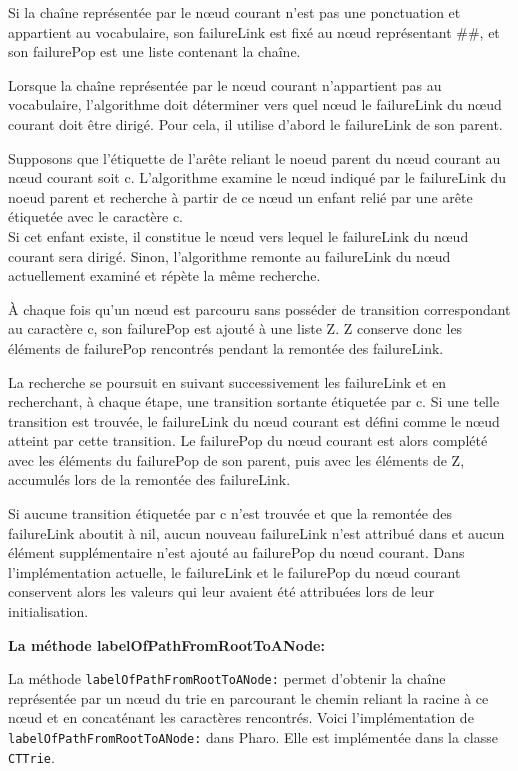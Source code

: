 \documentclass[12pt,a4paper]{report}
\begin{document}
	Si la chaîne représentée par le nœud courant n'est pas une ponctuation et appartient au vocabulaire, son failureLink est fixé au nœud représentant \#\#, et son failurePop est une liste contenant la chaîne.
	
	Lorsque la chaîne représentée par le nœud courant n'appartient pas au vocabulaire, l'algorithme doit déterminer vers quel nœud le failureLink du nœud courant doit être dirigé. Pour cela, il utilise d'abord le failureLink de son parent.
	
	Supposons que l'étiquette de l'arête reliant le noeud parent du nœud courant au nœud courant soit c. L'algorithme examine le nœud indiqué par le failureLink du noeud parent et recherche à partir de ce nœud un enfant relié par une arête étiquetée avec le caractère c.\\
	Si cet enfant existe, il constitue le nœud vers lequel le failureLink du nœud courant sera dirigé. Sinon, l'algorithme remonte au failureLink du nœud actuellement examiné et répète la même recherche.
	
	À chaque fois qu'un nœud est parcouru sans posséder de transition correspondant au caractère c, son failurePop est ajouté à une liste Z. Z conserve donc les éléments de failurePop rencontrés pendant la remontée des failureLink.
	
	La recherche se poursuit en suivant successivement les failureLink et en recherchant, à chaque étape, une transition sortante étiquetée par c. Si une telle transition est trouvée, le failureLink du nœud courant est défini comme le nœud atteint par cette transition. Le failurePop du nœud courant est alors complété avec les éléments du failurePop de son parent, puis avec les éléments de Z, accumulés lors de la remontée des failureLink.
	
	Si aucune transition étiquetée par c n'est trouvée et que la remontée des failureLink aboutit à nil, aucun nouveau failureLink n'est attribué dans et aucun élément supplémentaire n'est ajouté au failurePop du nœud courant. Dans l'implémentation actuelle, le failureLink et le failurePop du nœud courant conservent alors les valeurs qui leur avaient été attribuées lors de leur initialisation.
	
	\textbf{La méthode labelOfPathFromRootToANode:}
	
	La méthode \texttt{labelOfPathFromRootToANode:} permet d'obtenir la chaîne représentée par un nœud du trie en parcourant le chemin reliant la racine à ce nœud et en concaténant les caractères rencontrés. Voici l'implémentation de \texttt{labelOfPathFromRootToANode:} dans Pharo. Elle est implémentée dans la classe \texttt{CTTrie}.
	
\end{document}
